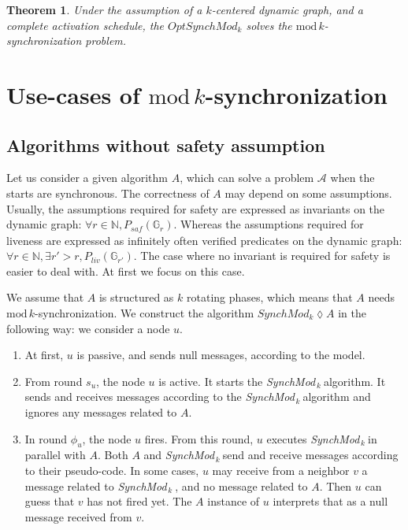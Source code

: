 \documentclass[11pt,letterpaper]{article}
\newtheorem{thm}{Theorem}
\newcommand{\tf}{\phi}
\newcommand{\SM}{{\em SynchMod}$_{\,k}\ $}
\begin{document}
\begin{thm} 
	Under the assumption of a $k$-centered dynamic graph, and a complete activation schedule,
	the $OptSynchMod_k$ solves the $\mathrm{mod}\,k$-synchronization problem.
\end{thm}

\section{Use-cases of $\mathrm{mod}\,k$-synchronization}

\subsection{Algorithms without safety assumption}

Let us consider a given algorithm $A$, which can solve a problem $\mathcal{A}$ when the starts are synchronous.
The correctness of $A$ may depend on some assumptions.
Usually, the assumptions required for safety are expressed as invariants on the dynamic graph: $\forall r \in \mathds{N}, P_{\mathit{saf}}(\mathds{G}_r)$.
Whereas the assumptions required for liveness are expressed as infinitely often verified predicates on the dynamic graph: $\forall r \in \mathds{N}, \exists r' > r, P_{\mathit{liv}}(\mathds{G}_{r'})$.
The case where no invariant is required for safety is easier to deal with. At first we focus on this case.

We assume that $A$ is structured as $k$ rotating phases, which means that $A$ needs $\mathrm{mod}\,k$-synchronization.
We construct the algorithm $SynchMod_k \lozenge A$ in the following way:
we consider a node $u$. 
\begin{enumerate}
	\item At first, $u$ is passive, and sends null messages, according to the model.
	\item From round $s_u$, the node $u$ is active. It starts the \SM algorithm. It sends and receives messages according to the \SM algorithm and ignores any messages related to $A$.
	\item In round $\tf_u$, the node $u$ fires. From this round, $u$ executes \SM in parallel with $A$. Both $A$ and \SM send and receive messages according to their pseudo-code.
		In some cases, $u$ may receive from a neighbor $v$ a message related to \SM, and no message related to $A$. Then $u$ can guess that $v$ has not fired yet.
		The $A$ instance of $u$ interprets that as a null message received from $v$.
\end{enumerate}
\end{document}
